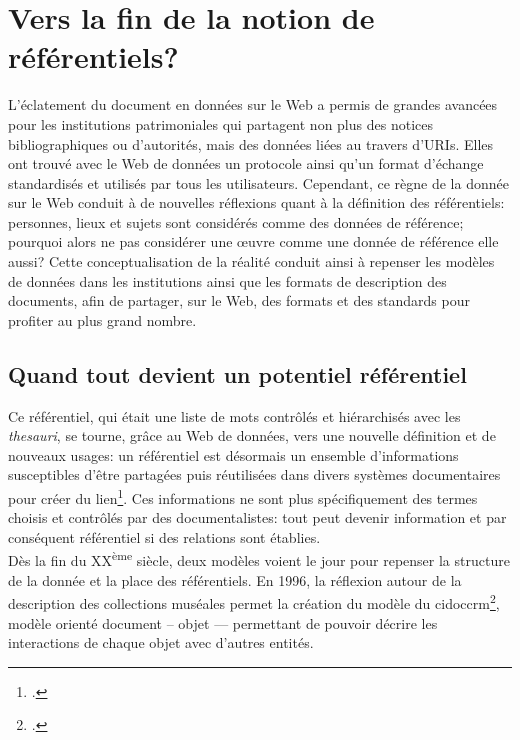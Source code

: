 \section{\label{II-A-3}Vers la fin de la notion de référentiels?}

L'éclatement du document en données sur le Web a permis de grandes avancées pour les institutions patrimoniales qui partagent non plus des notices bibliographiques ou d'autorités, mais des données liées au travers d'URIs. Elles ont trouvé avec le Web de données un protocole ainsi qu'un format d'échange standardisés et utilisés par tous les utilisateurs. Cependant, ce règne de la donnée sur le Web conduit à de nouvelles réflexions quant à la définition des référentiels: personnes, lieux et sujets sont considérés comme des données de référence; pourquoi alors ne pas considérer une œuvre comme une donnée de référence elle aussi? Cette conceptualisation de la réalité conduit ainsi à repenser les modèles de données dans les institutions ainsi que les formats de description des documents, afin de partager, sur le Web, des formats et des standards pour profiter au plus grand nombre.

\subsection{\label{II-A-3-a}Quand tout devient un potentiel référentiel}

Ce référentiel, qui était une liste de mots contrôlés et hiérarchisés avec les \textit{thesauri}, se tourne, grâce au Web de données, vers une nouvelle définition et de nouveaux usages: un référentiel est désormais un ensemble d'informations susceptibles d'être partagées puis réutilisées dans divers systèmes documentaires pour créer du lien\footcite[§49]{bermes_les_2013}. Ces informations ne sont plus spécifiquement des termes choisis et contrôlés par des documentalistes: tout peut devenir information et par conséquent référentiel si des relations sont établies.\\

Dès la fin du \textsc{XX}\textsuperscript{ème} siècle, deux modèles voient le jour pour repenser la structure de la donnée et la place des référentiels. En 1996, la réflexion autour de la description des collections muséales permet la création du modèle du \ac{cidoccrm}\footcite{noauthor_cidoc-crm_nodate}, modèle orienté document -- objet --- permettant de pouvoir décrire les interactions de chaque objet avec d'autres entités.\\

